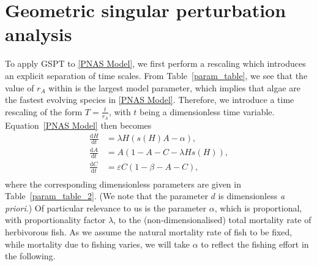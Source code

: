 \documentclass{article}
\theoremstyle{definition}
\numberwithin{equation}{section}
\newcommand{\dd}{\mathrm{d}}
\begin{document}
\section{Geometric singular perturbation analysis}
\label{section GPST}
To apply GSPT to \eqref{PNAS Model}, we first perform a rescaling which introduces an explicit separation of time scales. 
From Table~\ref{param_table}, we see that the value of $r_A$ within is the largest model parameter, which implies that algae are the fastest evolving species in \eqref{PNAS Model}. 
Therefore, we introduce a time rescaling of the form $T=\frac{t}{r_{A}}$, with $t$ being a dimensionless time variable. Equation~\eqref{PNAS Model} then becomes
\begin{equation}
\begin{split}
    \frac{\dd H}{\dd t} &=  \lambda H(s(H) A - \alpha), \\
    \frac{\dd A}{\dd t} &= A(1-A-C-\lambda H s(H)), \\
    \frac{\dd C}{\dd t} &= \varepsilon C(1-\beta-A-C),\\
\end{split}
\label{fast-system}
\end{equation}
where the corresponding dimensionless parameters are given in Table~\ref{param_table_2}. (We note that the parameter $d$ is dimensionless {\it a priori}.) Of particular relevance to us is the parameter $\alpha$, which is proportional, with proportionality factor $\lambda$, to the (non-dimensionalised) total mortality rate of herbivorous fish. As we assume the natural mortality rate of fish to be fixed, while mortality due to fishing varies, we will take $\alpha$ to reflect the fishing effort in the following.
\end{document}
